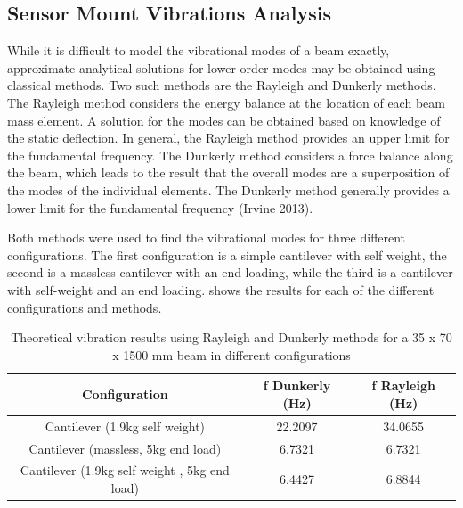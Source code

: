 \documentclass[main.tex]{subfiles}
\begin{document}
\begin{appendices}
\chapter{Sensor Mount Vibrations Analysis}
While it is difficult to model the vibrational modes of a beam exactly, approximate analytical solutions for lower order modes may be obtained using classical methods. Two such methods are the Rayleigh and Dunkerly methods. The Rayleigh method considers the energy balance at the location of each beam mass element. A solution for the modes can be obtained based on knowledge of the static deflection. In general, the Rayleigh method provides an upper limit for the fundamental frequency. The Dunkerly method considers a force balance along the beam, which leads to the result that the overall modes are a superposition of the modes of the individual elements. The Dunkerly method generally provides a lower limit for the fundamental frequency (Irvine 2013).

Both methods were used to find the vibrational modes for three different configurations. The first configuration is a simple cantilever with self weight, the second is a massless cantilever with an end-loading, while the third is a cantilever with self-weight and an end loading.   shows the results for each of the different configurations and methods.



\begin{table} [ht]
\centering
\caption[Theoretical vibration results using Rayleigh and Dunkerly methods]{Theoretical vibration results using Rayleigh and Dunkerly methods for a 35 x 70 x 1500 mm beam in different configurations }
\begin{tabular} {c c c}
\toprule
Configuration & f Dunkerly (Hz) & f Rayleigh (Hz)  \\ \midrule
Cantilever (1.9kg self weight) & 22.2097 & 34.0655  \\
Cantilever (massless, 5kg end load) & 6.7321 & 6.7321 \\
Cantilever (1.9kg self weight , 5kg end load) & 6.4427 & 6.8844 \\ \bottomrule
\end{tabular}
\end{table}


\end{appendices}
\end{document}
